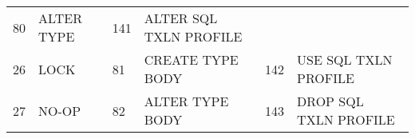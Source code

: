 \begin{longtable}[]{@{}llllll@{}}
\begin{minipage}[t]{0.06\columnwidth}
80\strut
\end{minipage} & \begin{minipage}[t]{0.24\columnwidth}\raggedright\strut
ALTER TYPE\strut
\end{minipage} & \begin{minipage}[t]{0.06\columnwidth}\raggedright\strut
141\strut
\end{minipage} & \begin{minipage}[t]{0.24\columnwidth}\raggedright\strut
ALTER SQL TXLN PROFILE\strut
\end{minipage}\tabularnewline
\begin{minipage}[t]{0.06\columnwidth}\raggedright\strut
26\strut
\end{minipage} & \begin{minipage}[t]{0.19\columnwidth}\raggedright\strut
LOCK\strut
\end{minipage} & \begin{minipage}[t]{0.06\columnwidth}\raggedright\strut
81\strut
\end{minipage} & \begin{minipage}[t]{0.24\columnwidth}\raggedright\strut
CREATE TYPE BODY\strut
\end{minipage} & \begin{minipage}[t]{0.06\columnwidth}\raggedright\strut
142\strut
\end{minipage} & \begin{minipage}[t]{0.24\columnwidth}\raggedright\strut
USE SQL TXLN PROFILE\strut
\end{minipage}\tabularnewline
\begin{minipage}[t]{0.06\columnwidth}\raggedright\strut
27\strut
\end{minipage} & \begin{minipage}[t]{0.19\columnwidth}\raggedright\strut
NO-OP\strut
\end{minipage} & \begin{minipage}[t]{0.06\columnwidth}\raggedright\strut
82\strut
\end{minipage} & \begin{minipage}[t]{0.24\columnwidth}\raggedright\strut
ALTER TYPE BODY\strut
\end{minipage} & \begin{minipage}[t]{0.06\columnwidth}\raggedright\strut
143\strut
\end{minipage} & \begin{minipage}[t]{0.24\columnwidth}\raggedright\strut
DROP SQL TXLN PROFILE\strut
\end{minipage}\tabularnewline

\end{longtable}
